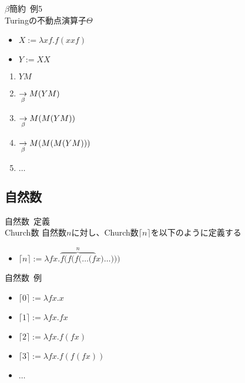 \documentclass[pdflatex,17pt]{beamer}
\begin{document}
\begin{frame}{$\beta$簡約~例5 \\ \small Turingの不動点演算子$\Theta$}
    \begin{itemize}
        \item \small $X := \lambda x f. f (x x f)$
        \item \small $Y := XX$
    \end{itemize}
    \begin{enumerate}
        \item \small $YM$
        \item \small $\underset{\beta}{\to} M(YM)$
        \item \small $\underset{\beta}{\to} M(M(YM))$
        \item \small $\underset{\beta}{\to} M(M(M(YM)))$
        \item \small $\dots$
    \end{enumerate}
\end{frame}

\newcommand{\church}[1]{\lceil #1 \rceil}
\subsection{自然数}
\subsectionpage
\begin{frame}{自然数~定義 \\ \small Church数}
    自然数$n$に対し、Church数$\church{n}$を以下のように定義する
    \begin{itemize}
        \item $\church{n} := \lambda f x. \overbrace{f (f (f (\dots (f}^n x) \dots)))$
    \end{itemize}
\end{frame}

\begin{frame}{自然数~例}
    \begin{itemize}
        \item $\church{0} := \lambda f x. x$
        \item $\church{1} := \lambda f x. f x$
        \item $\church{2} := \lambda f x. f (f x)$
        \item $\church{3} := \lambda f x. f (f (f x))$
        \item $\dots$
    \end{itemize}
\end{frame}
\end{document}
